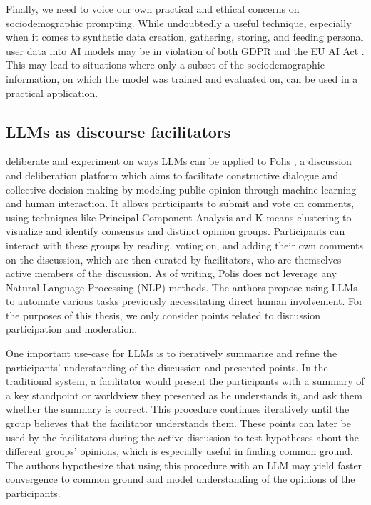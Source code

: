 Finally, we need to voice our own practical and ethical concerns on sociodemographic prompting. While undoubtedly a useful technique, especially when it comes to synthetic data creation, gathering, storing, and feeding personal user data into AI models may be in violation of both GDPR \cite{gdpr} and the EU AI Act \cite{eu_ai_act_2021}. This may lead to situations where only a subset of the sociodemographic information, on which the model was trained and evaluated on, can be used in a practical application.


\subsection{LLMs as discourse facilitators}
\label{sec:related:discource}

\cite{small-polis-llm} deliberate and experiment on ways LLMs can be applied to Polis \cite{small2021polis}, a discussion and deliberation platform which aims to facilitate constructive dialogue and collective decision-making by modeling public opinion through machine learning and human interaction. It allows participants to submit and vote on comments, using techniques like Principal Component Analysis and K-means clustering to visualize and identify consensus and distinct opinion groups. Participants can interact with these groups by reading, voting on, and adding their own comments on the discussion, which are then curated by facilitators, who are themselves active members of the discussion. As of writing, Polis does not leverage any Natural Language Processing (NLP) methods. The authors propose using LLMs to automate various tasks previously necessitating direct human involvement. For the purposes of this thesis, we only consider points related to discussion participation and moderation. 

One important use-case for LLMs is to iteratively summarize and refine the participants' understanding of the discussion and presented points. In the traditional system, a facilitator would present the participants with a summary of a key standpoint or worldview they presented as he understands it, and ask them whether the summary is correct. This procedure continues iteratively until the group believes that the facilitator understands them. These points can later be used by the facilitators during the active discussion to test hypotheses about the different groups' opinions, which is especially useful in finding common ground. The authors hypothesize that using this procedure with an LLM may yield faster convergence to common ground and model understanding of the opinions of the participants.

